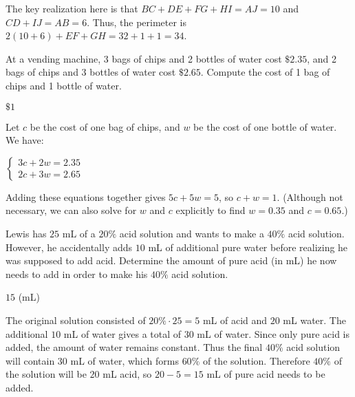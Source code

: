 \documentclass[11pt]{article}
\begin{document}
\begin{solution}
The key realization here is that $BC+DE+FG+HI = AJ = 10$ and $CD+IJ = AB = 6$. Thus, the perimeter is $2(10+6) + EF+GH=32 + 1 + 1 = \boxed{34}$.
\end{solution}


\begin{problem}
At a vending machine, 3 bags of chips and 2 bottles of water cost $\$2.35$, and 2 bags of chips and 3 bottles of water cost $\$2.65$. Compute the cost of 1 bag of chips and 1 bottle of water.
\end{problem}

\begin{answer}
$\boxed{\$1}$
\end{answer}

\begin{solution}
Let $c$ be the cost of one bag of chips, and $w$ be the cost of one bottle of water. We have: \begin{center}$\begin{cases} 3c + 2w = 2.35 \\ 2c + 3w = 2.65 \end{cases}$\end{center} Adding these equations together gives $5c + 5w = 5$, so $c + w = \boxed{1}$. (Although not necessary, we can also solve for $w$ and $c$ explicitly to find $w = 0.35$ and $c = 0.65$.)
\end{solution}


\begin{problem}
Lewis has $25$ mL of a $20\%$ acid solution and wants to make a $40\%$ acid solution. However, he accidentally adds $10$ mL of additional pure water before realizing he was supposed to add acid. Determine the amount of pure acid (in mL) he now needs to add in order to make his $40\%$ acid solution.
\end{problem}

\begin{answer}
$\boxed{15}$ (mL)
\end{answer}

\begin{solution}
The original solution consisted of $20\% \cdot 25 = 5$ mL of acid and $20$ mL water. The additional $10$ mL of water gives a total of $30$ mL of water. Since only pure acid is added, the amount of water remains constant. Thus the final $40\%$ acid solution will contain $30$ mL of water, which forms $60\%$ of the solution. Therefore $40\%$ of the solution will be $20$ mL acid, so $20 - 5 = \boxed{15}$ mL of pure acid needs to be added.
\end{solution}
\end{document}
